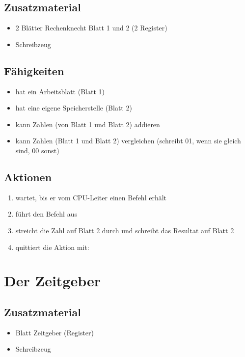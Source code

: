 \documentclass[a4paper]{kinet-intern}
\begin{document}
\subsection*{Zusatzmaterial}
\begin{itemize}
	\item 2 Blätter \dq{}Rechenknecht Blatt 1 und 2\dq{} (2 Register)
	\item Schreibzeug
\end{itemize}

\subsection*{Fähigkeiten}
\begin{itemize}
	\item hat ein Arbeitsblatt (Blatt 1)
	\item hat eine eigene Speicherstelle (Blatt 2)
	\item kann Zahlen (von Blatt 1 und Blatt 2) addieren
	\item kann Zahlen (Blatt 1 und Blatt 2) vergleichen (schreibt 01, wenn sie gleich sind, 00 sonst)
\end{itemize}

\subsection*{Aktionen}
\begin{enumerate}
	\item wartet, bis er vom CPU-Leiter einen Befehl erhält
	\item führt den Befehl aus
	\item streicht die Zahl auf Blatt 2 durch und schreibt das Resultat auf Blatt 2
	\item quittiert die Aktion mit: 
\end{enumerate}


\pagebreak
\vspace{1cm}
\section*{Der Zeitgeber}

\subsection*{Zusatzmaterial}
\begin{itemize}
	\item Blatt \dq{}Zeitgeber\dq{} (Register)
	\item Schreibzeug
\end{itemize}
\end{document}

